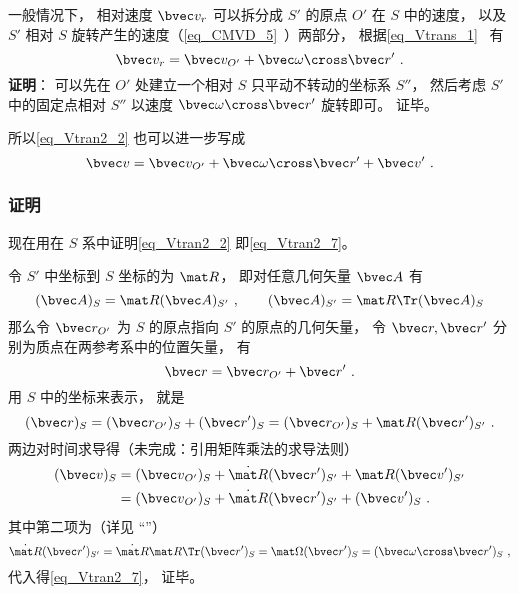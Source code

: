 一般情况下， 相对速度 $\bvec v_r$ 可以拆分成 $S'$ 的原点 $O'$ 在 $S$ 中的速度， 以及 $S'$ 相对 $S$ 旋转产生的速度（\autoref{eq_CMVD_5}~）两部分， 根据\autoref{eq_Vtrans_1}~ 有
\begin{equation}\label{eq_Vtran2_4}
\bvec v_r = \bvec v_{O'} + \bvec \omega \cross \bvec r'~.
\end{equation}
\textbf{证明}： 可以先在 $O'$ 处建立一个相对 $S$ 只平动不转动的坐标系 $S''$， 然后考虑 $S'$ 中的固定点相对 $S''$ 以速度 $\bvec \omega \cross \bvec r'$ 旋转即可。 证毕。

所以\autoref{eq_Vtran2_2} 也可以进一步写成
\begin{equation}\label{eq_Vtran2_7}
\bvec v = \bvec v_{O'} + \bvec \omega \cross \bvec r' + \bvec v'~.
\end{equation}

\subsubsection{证明}
现在用在 $S$ 系中证明\autoref{eq_Vtran2_2} 即\autoref{eq_Vtran2_7}。

令 $S'$ 中坐标到 $S$ 坐标的为 $\mat R$， 即对任意几何矢量 $\bvec A$ 有
\begin{equation}
(\bvec A)_S = \mat R (\bvec A)_{S'}~, \qquad
(\bvec A)_{S'} = \mat R\Tr (\bvec A)_S
\end{equation}
那么令 $\bvec r_{O'}$ 为 $S$ 的原点指向 $S'$ 的原点的几何矢量， 令 $\bvec r, \bvec r'$ 分别为质点在两参考系中的位置矢量， 有
\begin{equation}
\bvec r = \bvec r_{O'} + \bvec r'~.
\end{equation}
用 $S$ 中的坐标来表示， 就是
\begin{equation}
(\bvec r)_S = (\bvec r_{O'})_S + (\bvec r')_S = (\bvec r_{O'})_S + \mat R(\bvec r')_{S'}~.
\end{equation}
两边对时间求导得（未完成：引用矩阵乘法的求导法则）
\begin{equation}
\begin{aligned}
(\bvec v)_S &= ({\bvec v}_{O'})_S + \dot{\mat R}(\bvec r')_{S'} + \mat R (\bvec v')_{S'}\\
&= ({\bvec v}_{O'})_S + \dot{\mat R}(\bvec r')_{S'} + (\bvec v')_S~.
\end{aligned}
\end{equation}
其中第二项为（详见 “”）
\begin{equation}
\dot{\mat R}(\bvec r')_{S'} = \dot{\mat R}\mat R\Tr (\bvec r')_S = \mat \Omega (\bvec r')_S = (\bvec \omega \cross \bvec r')_S~,
\end{equation}
代入得\autoref{eq_Vtran2_7}， 证毕。
